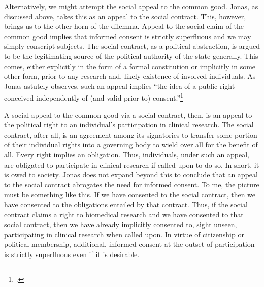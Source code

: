 \documentclass[letterpaper,notitlepage,12pt]{article}
\begin{document}
Alternatively, we might attempt the social appeal to the common good.
Jonas, as discussed above, takes this as an appeal to the social contract.
This, however, brings us to the other horn of the dilemma.
Appeal to the social claim of the common good implies that informed consent is strictly superfluous and we may simply conscript subjects.
The social contract, as a political abstraction, is argued to be the legitimating source of the political authority of the state generally.
This comes, either explicitly in the form of a formal constitution or implicitly in some other form, prior to any research and, likely existence of involved individuals.
As Jonas astutely observes, such an appeal implies ``the idea of a public right conceived independently of (and valid prior to) consent.''\footcite[p. 222]{jonas_philosophical_1969}

A social appeal to the common good via a social contract, then, is an appeal to the political right to an individual's participation in clinical research. The social contract, after all, is an agreement among its signatories to transfer some portion of their individual rights into a governing body to wield over all for the benefit of all.
Every right implies an obligation.
Thus, individuals, under such an appeal, are obligated to participate in clinical research if called upon to do so.
In short, it is owed to society.
Jonas does not expand beyond this to conclude that an appeal to the social contract abrogates the need for informed consent.
To me, the picture must be something like this.
If we have consented to the social contract, then we have consented to the obligations entailed by that contract.
Thus, if the social contract claims a right to biomedical research and we have consented to that social contract, then we have already implicitly consented to, sight unseen, participating in clinical research when called upon.
In virtue of citizenship or political membership, additional, informed consent at the outset of participation is strictly superfluous even if it is desirable.
\end{document}

